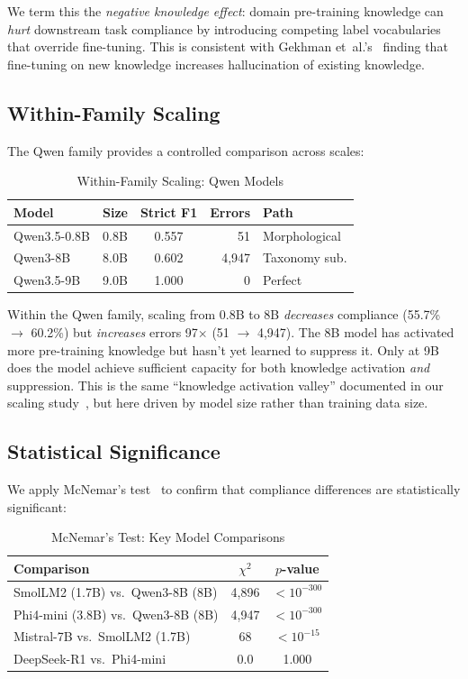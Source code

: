 \documentclass[review,3p]{elsarticle}
\begin{document}
We term this the \emph{negative knowledge effect}: domain pre-training knowledge can \emph{hurt} downstream task compliance by introducing competing label vocabularies that override fine-tuning. This is consistent with Gekhman et~al.'s~\cite{gekhman2024} finding that fine-tuning on new knowledge increases hallucination of existing knowledge.

\subsection{Within-Family Scaling}
The Qwen family provides a controlled comparison across scales:

\begin{table}[!ht]
\centering
\caption{Within-Family Scaling: Qwen Models}
\label{tab:qwen}
\begin{tabular}{lccrl}
\toprule
\textbf{Model} & \textbf{Size} & \textbf{Strict F1} & \textbf{Errors} & \textbf{Path} \\
\midrule
Qwen3.5-0.8B & 0.8B & 0.557 & 51 & Morphological \\
Qwen3-8B & 8.0B & 0.602 & 4,947 & Taxonomy sub. \\
Qwen3.5-9B & 9.0B & 1.000 & 0 & Perfect \\
\bottomrule
\end{tabular}
\end{table}

Within the Qwen family, scaling from 0.8B to 8B \emph{decreases} compliance (55.7\% $\to$ 60.2\%) but \emph{increases} errors 97$\times$ (51 $\to$ 4,947). The 8B model has activated more pre-training knowledge but hasn't yet learned to suppress it. Only at 9B does the model achieve sufficient capacity for both knowledge activation \emph{and} suppression. This is the same ``knowledge activation valley'' documented in our scaling study~\cite{p6}, but here driven by model size rather than training data size.

\subsection{Statistical Significance}
We apply McNemar's test~\cite{mcnemar1947} to confirm that compliance differences are statistically significant:

\begin{table}[!ht]
\centering
\caption{McNemar's Test: Key Model Comparisons}
\label{tab:stat}
\begin{tabular}{lcc}
\toprule
\textbf{Comparison} & \textbf{$\chi^2$} & \textbf{$p$-value} \\
\midrule
SmolLM2 (1.7B) vs.\ Qwen3-8B (8B) & 4,896 & $<10^{-300}$ \\
Phi4-mini (3.8B) vs.\ Qwen3-8B (8B) & 4,947 & $<10^{-300}$ \\
Mistral-7B vs.\ SmolLM2 (1.7B) & 68 & $<10^{-15}$ \\
DeepSeek-R1 vs.\ Phi4-mini & 0.0 & 1.000 \\
\bottomrule
\end{tabular}
\end{table}
\end{document}
